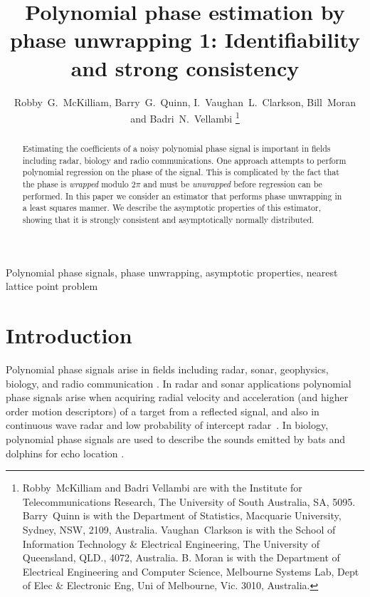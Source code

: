 \documentclass[journal]{IEEEtran}
\title{Polynomial phase estimation by phase unwrapping 1: Identifiability and strong consistency}
\author{Robby~G.~McKilliam, Barry~G.~Quinn, I.~Vaughan~L.~Clarkson, Bill~Moran and Badri~N.~Vellambi%
    \thanks{%
Robby~McKilliam and Badri Vellambi are with the Institute for Telecommunications Research, The University of South Australia, SA, 5095.  Barry~Quinn is with the Department of Statistics, Macquarie University, Sydney, NSW, 2109, Australia.   Vaughan~Clarkson is with the School of Information Technology \& Electrical Engineering, The University of Queensland, QLD., 4072, Australia.  B. Moran is with the Department of Electrical Engineering and Computer
Science, Melbourne Systems Lab, Dept of Elec \& Electronic Eng, Uni of Melbourne, Vic. 3010, Australia.}}
\begin{document}
 
\maketitle

\begin{abstract}
Estimating the coefficients of a noisy polynomial phase signal is important in fields including radar, biology and radio communications. One approach attempts to perform polynomial regression on the phase of the signal.  This is complicated by the fact that the phase is \emph{wrapped} modulo $2\pi$ and must be \emph{unwrapped} before regression can be performed. %
In this paper we consider an estimator that performs phase unwrapping in a least squares manner.  We describe the asymptotic properties of this estimator, showing that it is strongly consistent and asymptotically normally distributed. %
\end{abstract}

\begin{keywords}
Polynomial phase signals, phase unwrapping, asymptotic properties, nearest lattice point problem
\end{keywords}
 
%

\section{Introduction} \label{intro}

Polynomial phase signals arise in fields including radar, sonar, geophysics, biology, and radio communication \cite{Angeby_estimating_2000}. In radar and sonar applications polynomial phase signals arise when acquiring radial velocity and acceleration (and higher order motion descriptors) of a target from a reflected signal, and also in continuous wave radar and low probability of intercept radar~\cite{Levanon_Radar_signals_2004}.  In biology, polynomial phase signals are used to describe the sounds emitted by bats and dolphins for echo location \citep{Suga_1975_bats_echolocation, Moss_2005echolocation}.  
\end{document}
